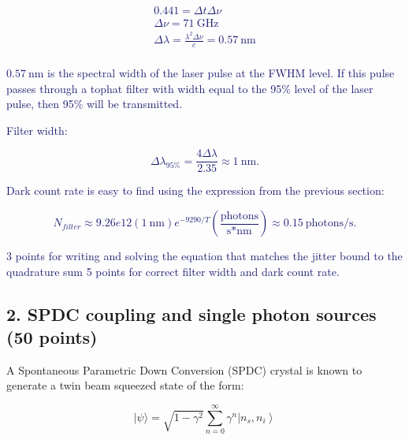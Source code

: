 \documentclass[11pt]{caltech_thesis} %
\begin{document}
\begin{enumerate}
{  }

  \textcolor{midnightblue}{

  $$\begin{aligned}
   0.441 = \Delta t \Delta \nu \\
   \Delta \nu = 71~\text{GHz} \\
   \Delta \lambda = \frac{\lambda^2 \Delta \nu}{c} = 0.57~\text{nm} \\
   \end{aligned}$$

  }

  \textcolor{midnightblue}{ $0.57~\text{nm}$ is the spectral width of the laser pulse at the FWHM level. If this pulse passes through a tophat filter with width equal to the 95\% level of the laser pulse, then 95\% will be transmitted. }

  \textcolor{midnightblue}{Filter width: }

  \textcolor{midnightblue}{

  $$\Delta \lambda_{95\%} = \frac{4 \Delta \lambda}{2.35} \approx \boxed{1~\text{nm}}.$$

  }

  \textcolor{midnightblue}{Dark count rate is easy to find using the expression from the previous section: }

  \textcolor{midnightblue}{

  $$\boxed{N_{filter} \approx 9.26e12 (1~\text{nm}) e^{-9290/T} (\frac{\text{photons}}{\text{s*nm}})} \approx 0.15~\text{photons/s}.$$

  }

  \textcolor{midnightblue}{3 points for writing and solving the equation that matches the jitter bound to the quadrature sum }
  \textcolor{midnightblue}{5 points for correct filter width and dark count rate.}
\end{enumerate}

\hypertarget{spdc-coupling-and-single-photon-sources-50-points}{%
\subsection{2. SPDC coupling and single photon sources (50 points)}\label{spdc-coupling-and-single-photon-sources-50-points}}

A Spontaneous Parametric Down Conversion (SPDC) crystal is known to generate a twin beam squeezed state of the form:

$$|\psi\rangle= \sqrt{1 - \gamma^2} \sum_{n=0}^{\infty} \gamma^{n}\left|n_{s}, n_{i}\right\rangle $$
\end{document}
